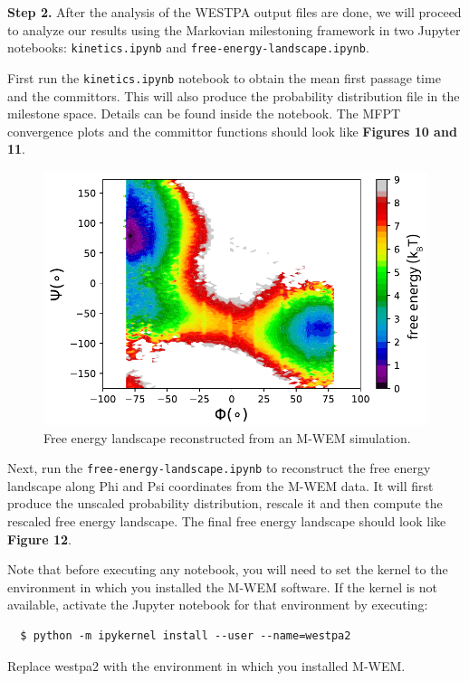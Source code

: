 \textbf{Step 2.} After the analysis of the WESTPA output files are done, we will proceed to analyze our results using the Markovian milestoning framework in two Jupyter notebooks: \verb|kinetics.ipynb| and \verb|free-energy-landscape.ipynb|.

First run the \verb|kinetics.ipynb| notebook to obtain the mean first passage time and the committors. 
This will also produce the probability distribution file in the milestone space. Details can be found inside the notebook. 
The MFPT convergence plots and the committor functions should look like \textbf{Figures 10 and 11}.

\begin{figure}[t]
\centering
\includegraphics[width=\columnwidth]{figures/Figure12_RFree.pdf}
\caption{Free energy landscape reconstructed from an M-WEM simulation.}
\end{figure}

Next, run the \verb|free-energy-landscape.ipynb| to reconstruct the free energy landscape along Phi and Psi coordinates from the M-WEM data. 
It will first produce the unscaled probability distribution, rescale it and then compute the rescaled free energy landscape. 
The final free energy landscape should look like \textbf{Figure 12}.

Note that before executing any notebook, you will need to set the kernel to the environment in which you installed the M-WEM software. 
If the kernel is not available, activate the Jupyter notebook for that environment by executing:

\begin{verbatim}
  $ python -m ipykernel install --user --name=westpa2
\end{verbatim}
Replace westpa2 with the environment in which you installed M-WEM.

